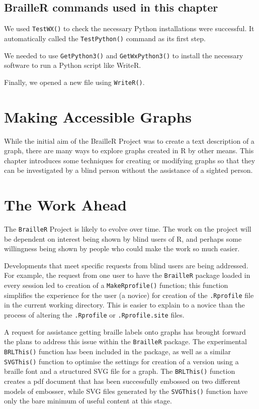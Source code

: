 \documentclass[
]{book}
\begin{document}
\hypertarget{brailler-commands-used-in-this-chapter-6}{%
\section{BrailleR commands used in this chapter}\label{brailler-commands-used-in-this-chapter-6}}

We used \texttt{TestWX()} to check the necessary Python installations were successful. It automatically called the \texttt{TestPython()} command as its first step.

We needed to use \texttt{GetPython3()} and \texttt{GetWxPython3()} to install the necessary software to run a Python script like WriteR.

Finally, we opened a new file using \texttt{WriteR()}.

\hypertarget{AccessibleGraphs}{%
\chapter{Making Accessible Graphs}\label{AccessibleGraphs}}

While the initial aim of the BrailleR Project was to create a text description of a graph, there are many ways to explore graphs created in R by other means. This chapter introduces some techniques for creating or modifying graphs so that they can be investigated by a blind person without the assistance of a sighted person.

\hypertarget{LookingAhead}{%
\chapter{The Work Ahead}\label{LookingAhead}}

The \texttt{BrailleR} Project is likely to evolve over time. The work on the project will be dependent on interest being shown by blind users of R, and perhaps some willingness being shown by people who could make the work so much easier.

Developments that meet specific requests from blind users are being addressed. For example, the request from one user to have the \texttt{BrailleR} package loaded in every session led to creation of a \texttt{MakeRprofile()} function; this function simplifies the experience for the user (a novice) for creation of the \texttt{.Rprofile} file in the current working directory. This is easier to explain to a novice than the process of altering the \texttt{.Rprofile} or \texttt{.Rprofile.site} files.

A request for assistance getting braille labels onto graphs has brought forward the plans to address this issue within the \texttt{BrailleR} package. The experimental \texttt{BRLThis()} function has been included in the package, as well as a similar \texttt{SVGThis()} function to optimise the settings for creation of a version using a braille font and a structured SVG file for a graph. The \texttt{BRLThis()} function creates a pdf document that has been successfully embossed on two different models of embosser, while SVG files generated by the \texttt{SVGThis()} function have only the bare minimum of useful content at this stage.
\end{document}
